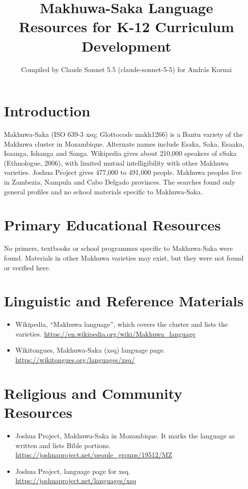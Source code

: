 \documentclass[12pt]{article}
\title{Makhuwa-Saka Language Resources for K-12 Curriculum Development}
\author{Compiled by Claude Sonnet 5.5 (claude-sonnet-5-5) for Andr\'as Kornai}
\date{}
\begin{document}
\maketitle

\section{Introduction}
Makhuwa-Saka (ISO 639-3 xsq; Glottocode makh1266) is a Bantu variety of the Makhuwa cluster in Mozambique. Alternate names include Esaka, Saka, Esaaka, Isaanga, Ishanga and Sanga. Wikipedia gives about 210,000 speakers of eSaka (Ethnologue, 2006), with limited mutual intelligibility with other Makhuwa varieties. Joshua Project gives 477,000 to 491,000 people. Makhuwa peoples live in Zambezia, Nampula and Cabo Delgado provinces. The searches found only general profiles and no school materials specific to Makhuwa-Saka.

\section{Primary Educational Resources}
No primers, textbooks or school programmes specific to Makhuwa-Saka were found. Materials in other Makhuwa varieties may exist, but they were not found or verified here.

\section{Linguistic and Reference Materials}
\begin{itemize}
\item Wikipedia, ``Makhuwa language'', which covers the cluster and lists the varieties. \url{https://en.wikipedia.org/wiki/Makhuwa_language}
\item Wikitongues, Makhuwa-Saka (xsq) language page. \url{https://wikitongues.org/languages/xsq/}
\end{itemize}

\section{Religious and Community Resources}
\begin{itemize}
\item Joshua Project, Makhuwa-Saka in Mozambique. It marks the language as written and lists Bible portions. \url{https://joshuaproject.net/people_groups/19512/MZ}
\item Joshua Project, language page for xsq. \url{https://joshuaproject.net/languages/xsq}
\end{itemize}
\end{document}

